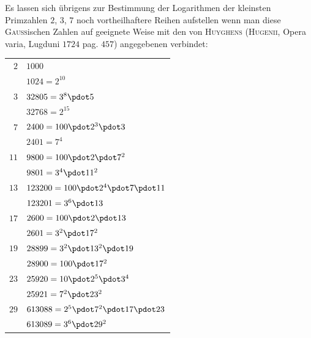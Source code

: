 Es lassen sich übrigens zur Bestimmung der Logarithmen der kleinsten Primzahlen $2$, $3$, $7$ noch vortheilhaftere Reihen aufstellen wenn man diese \textsc{Gauss}ischen Zahlen auf geeignete Weise mit den von \textsc{Huyghens} (\textsc{Hugenii}, Opera varia, Lugduni $1724$ pag. $457$) angegebenen verbindet:
\begingroup\renewcommand{\arraystretch}{1.15}
\begin{longtable}{@{}rl@{}}
$2$ & $1000$\\
 & $1024=2^{10}$\\
$3$ & $32805=3^8\pdot 5$\\
 & $32768=2^{15}$\\
$7$ & $2400=100\pdot 2^3\pdot 3$\\
 & $2401=7^4$\\
$11$ & $9800=100\pdot 2\pdot 7^2$\\
 & $9801=3^4\pdot 11^2$\\
$13$ & $123200=100\pdot 2^4\pdot 7\pdot 11$\\
 & $123201=3^6\pdot 13$\\
$17$ & $2600=100\pdot 2\pdot 13$\\
 & $2601=3^2\pdot 17^2$\\
$19$ & $28899=3^2\pdot 13^2\pdot 19$\\
 & $28900=100\pdot 17^2$\\
$23$ & $25920=10\pdot 2^5\pdot 3^4$\\
 & $25921=7^2\pdot 23^2$\\
$29$ & $613088=2^5\pdot 7^2\pdot 17\pdot 23$\\
 & $613089=3^6\pdot 29^2$\\
\end{longtable}\endgroup
